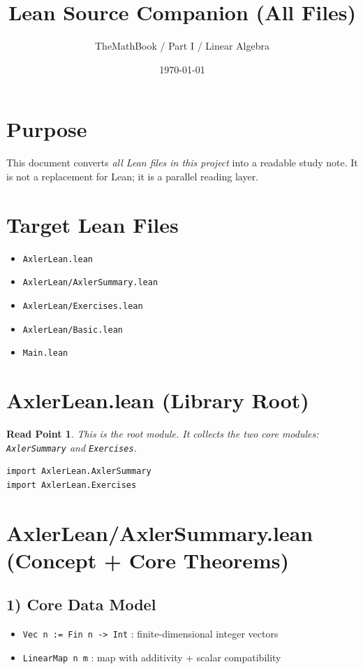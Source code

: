 \documentclass[11pt]{article}
\title{Lean Source Companion (All Files)}
\author{TheMathBook / Part I / Linear Algebra}
\date{\today}
\newtheorem*{readpoint}{Read Point}
\begin{document}
\maketitle

\section*{Purpose}
This document converts \emph{all Lean files in this project} into a readable study note.
It is not a replacement for Lean; it is a parallel reading layer.

\section*{Target Lean Files}
\begin{itemize}[leftmargin=1.5em]
  \item \texttt{AxlerLean.lean}
  \item \texttt{AxlerLean/AxlerSummary.lean}
  \item \texttt{AxlerLean/Exercises.lean}
  \item \texttt{AxlerLean/Basic.lean}
  \item \texttt{Main.lean}
\end{itemize}

\section{AxlerLean.lean (Library Root)}
\begin{readpoint}
This is the root module. It collects the two core modules:
\texttt{AxlerSummary} and \texttt{Exercises}.
\end{readpoint}

\begin{lstlisting}
import AxlerLean.AxlerSummary
import AxlerLean.Exercises
\end{lstlisting}

\section{AxlerLean/AxlerSummary.lean (Concept + Core Theorems)}

\subsection*{1) Core Data Model}
\begin{itemize}[leftmargin=1.5em]
  \item \texttt{Vec n := Fin n -> Int} : finite-dimensional integer vectors
  \item \texttt{LinearMap n m} : map with additivity + scalar compatibility
\end{itemize}
\end{document}
